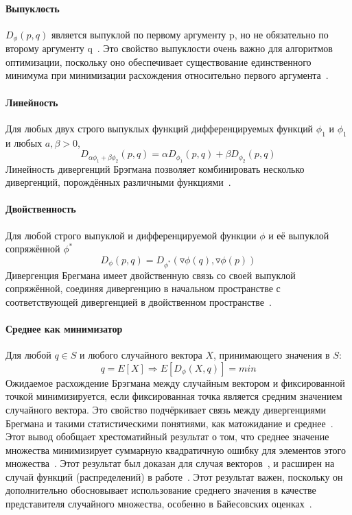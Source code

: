 \documentclass[12pt]{scrartcl}
\begin{document}
\paragraph{Выпуклость} $D_\phi(p,q)$ является выпуклой по первому аргументу p, но не обязательно по второму аргументу q~\cite{Nielsen2017}. Это свойство выпуклости очень важно для алгоритмов оптимизации, поскольку оно обеспечивает существование единственного минимума при минимизации расхождения относительно первого аргумента~\cite{Frigyik2008a}.
\paragraph{Линейность}\label{par:linearity}
Для любых двух строго выпуклых функций дифференцируемых функций $\phi_{1}$ и $\phi_{1}$ и любых $a,\beta > 0$,
\begin{equation}
    D_{\alpha \phi_{1} + \beta \phi_{2}}(p,q) = \alpha D_{\phi_{1}} (p,q) + \beta D_{\phi_{2}} (p,q)
\end{equation}
Линейность дивергенций Брэгмана позволяет комбинировать несколько дивергенций, порождённых различными функциями~\cite{Reid2013}.
\paragraph{Двойственность}\label{par:duality}
Для любой строго выпуклой и дифференцируемой функции $\phi$ и её выпуклой сопряжённой $\phi^{*}$
\begin{equation}
    D_{\phi}(p,q) = D_{\phi^{*}}(\triangledown \phi(q), \triangledown \phi(p))
\end{equation}
Дивергенция Брегмана имеет двойственную связь со своей выпуклой сопряжённой, соединяя дивергенцию в начальном пространстве с соответствующей дивергенцией в двойственном пространстве~\cite{Nielsen2019}.
\paragraph{Среднее как минимизатор}\label{par:mean_as_minimizer}
Для любой $q \in S$ и любого случайного вектора $X$, принимающего значения в $S$:
\begin{equation}
    q =  E[X] \Longrightarrow E[D_\phi (X,q)] = min
\end{equation}
Ожидаемое расхождение Брэгмана между случайным вектором и фиксированной точкой минимизируется, если фиксированная точка является средним значением случайного вектора. Это свойство подчёркивает связь между дивергенциями Брегмана и такими статистическими понятиями, как матожидание и среднее~\cite{Iyer2012}. Этот вывод обобщает хрестоматийный результат о том, что среднее значение множества минимизирует суммарную квадратичную ошибку для элементов этого множества~\cite{Nielsen2007a}.  Этот результат был доказан для случая векторов~\cite{JMLR:v6:banerjee05b}, и расширен на случай функций (распределений) в работе~\cite{Frigyik2008}. Этот результат важен, поскольку он дополнительно обосновывает использование среднего значения в качестве представителя случайного множества, особенно в Байесовских оценках~\cite{Jiao2014}.
\end{document}
